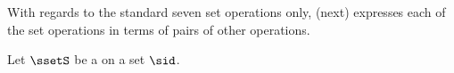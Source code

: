 With regards to the standard seven set operations only,
 (next) expresses each of the set operations
in terms of pairs of other operations.
\begin{theorem}
\label{thm:ss_rel_gg}
\end{theorem}

\begin{definition}
\label{def:subset}
Let $\ssetS$ be a   on a set $\sid$.
\end{definition}

